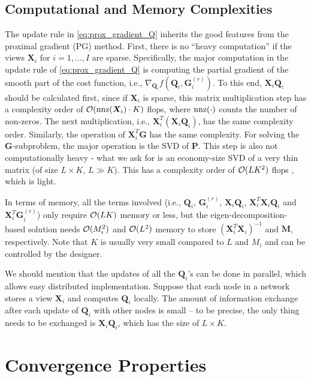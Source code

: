\documentclass[10pt,journal]{IEEEtran}
\newcommand{\G}{\boldsymbol{G}}
\newcommand{\Q}{\boldsymbol{Q}}
\newcommand{\X}{\boldsymbol{X}}
\begin{document}
\subsection{Computational and Memory Complexities}
The update rule in \eqref{eq:prox_gradient_Q} inherits the good features from
the proximal gradient (PG) method.
First, there is no ``heavy computation'' if the views $\X_i$ for $i=1,\ldots,I$ are sparse. Specifically, the major computation in the update rule of \eqref{eq:prox_gradient_Q} is computing the partial gradient of the smooth part of the cost function, i.e., $\nabla_{\Q_i} f(\Q_i,\G_i^{(r)})$.
To this end, ${\bm X}_i{\bm Q}_i$ should be calculated first, since if ${\bm X}_i$ is sparse,
this matrix multiplication step has a complexity order of ${\cal O}({\rm nnz}({\bm X}_i)\cdot K)$ flops,
where ${\rm nnz}(\cdot)$ counts the number of non-zeros. The next multiplication, i.e., ${\bm X}_i^T({\bm X}_i{\bm Q}_i)$, has the same complexity order.
Similarly, the operation of $\X_i^T\G$ has the same complexity.
For solving the $\G$-subproblem, the major operation is the SVD of ${\bm P}$.
This step is also not computationally heavy - what we ask for is an economy-size SVD of a very thin matrix (of size $L\times K$, $L\gg K$).
This has a complexity order of ${\cal O}(LK^2)$ flops \cite{GHGolub1996}, which is light.

In terms of memory, all the terms involved (i.e., ${\bm Q}_i$, ${\bm G}_i^{(r)}$, ${\bm X}_i{\bm Q}_i$, ${\bm X}_i^T{\bm X}_i{\bm Q}_i$ and ${\bm X}_i^T{\bm G}_i^{(r)}$) only require ${\cal O}(LK)$ memory or less,
but the eigen-decomposition-based solution needs ${\cal O}(M_i^2)$ and ${\cal O}(L^2)$ memory to store $({\bm X}_i^T{\bm X}_i)^{-1}$ and ${\bm M}$, respectively. Note that $K$ is usually very small compared to $L$ and $M_i$ and can be controlled by the designer.

We should mention that the updates of all the ${\bm Q}_i$'s can be done in parallel, which allows easy distributed implementation. Suppose that each node in a network stores a view $\X_i$ and computes $\Q_i$ locally. The amount of information exchange after each update of $\Q_i$ with other nodes is small -- to be precise, the only thing needs to be exchanged is $\X_i\Q_i$, which has the size of $L\times K$.

\section{Convergence Properties}
\end{document}
